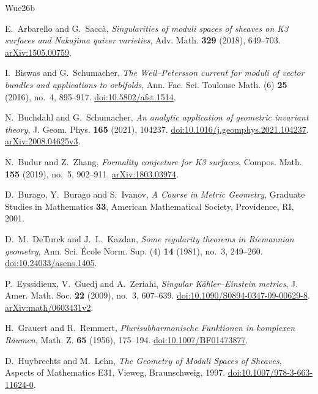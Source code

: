 \begin{thebibliography}{Wue26b}

E.~Arbarello and G.~Sacc\`a,
\emph{Singularities of moduli spaces of sheaves on K3 surfaces and
Nakajima quiver varieties}, Adv. Math. \textbf{329} (2018), 649--703.
\href{https://arxiv.org/abs/1505.00759}{arXiv:1505.00759}.

I.~Biswas and G.~Schumacher,
\emph{The Weil--Petersson current for moduli of vector bundles and
applications to orbifolds}, Ann. Fac. Sci. Toulouse Math. (6)
\textbf{25} (2016), no.~4, 895--917.
\href{https://doi.org/10.5802/afst.1514}{doi:10.5802/afst.1514}.

N.~Buchdahl and G.~Schumacher,
\emph{An analytic application of geometric invariant theory},
J. Geom. Phys. \textbf{165} (2021), 104237.
\href{https://doi.org/10.1016/j.geomphys.2021.104237}{doi:10.1016/j.geomphys.2021.104237}.
\href{https://arxiv.org/abs/2008.04625v3}{arXiv:2008.04625v3}.

N.~Budur and Z.~Zhang, \emph{Formality conjecture for K3 surfaces},
Compos. Math. \textbf{155} (2019), no.~5, 902--911.
\href{https://arxiv.org/abs/1803.03974}{arXiv:1803.03974}.

D.~Burago, Y.~Burago and S.~Ivanov,
\emph{A Course in Metric Geometry}, Graduate Studies in Mathematics
\textbf{33}, American Mathematical Society, Providence, RI, 2001.

D.~M.~DeTurck and J.~L.~Kazdan,
\emph{Some regularity theorems in Riemannian geometry},
Ann. Sci. \'Ecole Norm. Sup. (4) \textbf{14} (1981), no.~3, 249--260.
\href{https://doi.org/10.24033/asens.1405}{doi:10.24033/asens.1405}.

P.~Eyssidieux, V.~Guedj and A.~Zeriahi,
\emph{Singular K\"ahler--Einstein metrics}, J. Amer. Math. Soc.
\textbf{22} (2009), no.~3, 607--639.
\href{https://doi.org/10.1090/S0894-0347-09-00629-8}{doi:10.1090/S0894-0347-09-00629-8}.
\href{https://arxiv.org/abs/math/0603431v2}{arXiv:math/0603431v2}.

H.~Grauert and R.~Remmert,
\emph{Plurisubharmonische Funktionen in komplexen R\"aumen},
Math. Z. \textbf{65} (1956), 175--194.
\href{https://doi.org/10.1007/BF01473877}{doi:10.1007/BF01473877}.

D.~Huybrechts and M.~Lehn,
\emph{The Geometry of Moduli Spaces of Sheaves},
Aspects of Mathematics E31, Vieweg, Braunschweig, 1997.
\href{https://doi.org/10.1007/978-3-663-11624-0}{doi:10.1007/978-3-663-11624-0}.


\end{thebibliography}

